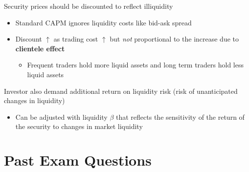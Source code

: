 \documentclass[]{book}
\providecommand{\tightlist}{%
  \setlength{\itemsep}{0pt}\setlength{\parskip}{0pt}}
\theoremstyle{definition}
\theoremstyle{definition}
\theoremstyle{remark}
\begin{document}
Security prices should be discounted to reflect illiquidity

\begin{itemize}
\item
  Standard CAPM ignores liquidity costs like bid-ask spread
\item
  Discount \(\uparrow\) as trading cost \(\uparrow\) but \emph{not}
  proportional to the increase due to \textbf{clientele effect}

  \begin{itemize}
  \tightlist
  \item
    Frequent traders hold more liquid assets and long term traders hold
    less liquid assets
  \end{itemize}
\end{itemize}

Investor also demand additional return on liquidity risk (risk of
unanticipated changes in liquidity)

\begin{itemize}
\tightlist
\item
  Can be adjusted with liquidity \(\beta\) that reflects the sensitivity
  of the return of the security to changes in market liquidity
\end{itemize}

\section{Past Exam Questions}\label{past-exam-questions-3}
\end{document}
